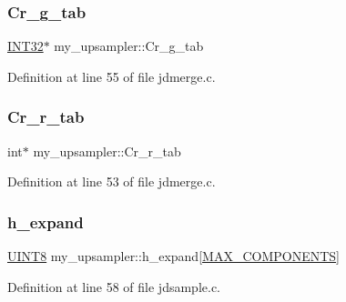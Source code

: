 \mbox{\label{structmy__upsampler_a1a14abca6bd59cb35c4e3ee51f1ed8f5}} 
\subsubsection{\texorpdfstring{Cr\_g\_tab}{Cr\_g\_tab}}
{\footnotesize\ttfamily \mbox{\hyperlink{jmorecfg_8h_a0cb58e7e6f0bad369840a52e54a56ae0}{I\+N\+T32}}$\ast$ my\+\_\+upsampler\+::\+Cr\+\_\+g\+\_\+tab}



Definition at line 55 of file jdmerge.\+c.

\mbox{\label{structmy__upsampler_a4f008494aac28cbf152a2bf05049dfca}} 
\subsubsection{\texorpdfstring{Cr\_r\_tab}{Cr\_r\_tab}}
{\footnotesize\ttfamily int$\ast$ my\+\_\+upsampler\+::\+Cr\+\_\+r\+\_\+tab}



Definition at line 53 of file jdmerge.\+c.

\mbox{\label{structmy__upsampler_a4a82028e54b1f7e57b2c1f7d63290f65}} 
\subsubsection{\texorpdfstring{h\_expand}{h\_expand}}
{\footnotesize\ttfamily \mbox{\hyperlink{jmorecfg_8h_adfb9a8ea1dd59f151065f763e1e9acd6}{U\+I\+N\+T8}} my\+\_\+upsampler\+::h\+\_\+expand\mbox{[}\mbox{\hyperlink{jmorecfg_8h_a6d8c910a1fdb6d4762a05f7250e64322}{M\+A\+X\+\_\+\+C\+O\+M\+P\+O\+N\+E\+N\+TS}}\mbox{]}}



Definition at line 58 of file jdsample.\+c.

\mbox{\label{structmy__upsampler_a3f1f669c2871ccaee6009ec6f96899d3}} 
